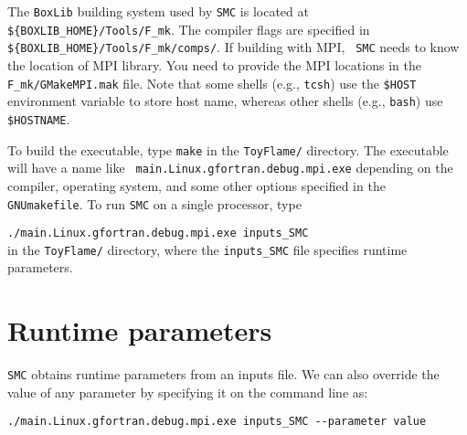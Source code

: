 \documentclass[11pt,letterpaper]{article}
\begin{document}
The {\tt BoxLib} building system used by {\tt SMC} is located at {\tt
  \$\{BOXLIB\_HOME\}/Tools/F\_mk}.  The compiler flags are specified in {\tt
  \$\{BOXLIB\_HOME\}/Tools/F\_mk/comps/}.  If building with MPI, {\tt
  SMC} needs to know the location of MPI library.  You need to provide
the MPI locations in the {\tt F\_mk/GMakeMPI.mak} file.  Note that
some shells (e.g., {\tt tcsh}) use the {\tt \$HOST} environment
variable to store host name, whereas other shells (e.g., {\tt bash})
use {\tt \$HOSTNAME}.

To build the executable, type {\tt make} in the {\tt ToyFlame/}
directory.  The executable will have a name like {\tt
  main.Linux.gfortran.debug.mpi.exe} depending on the compiler,
operating system, and some other options specified in the {\tt
  GNUmakefile}.  To run {\tt SMC} on a single processor, type
\vspace{5pt}

\verb|./main.Linux.gfortran.debug.mpi.exe inputs_SMC|\vspace{5pt}\\
in the {\tt ToyFlame/} directory, where the {\tt inputs\_SMC} file
specifies runtime parameters. 

\section{Runtime parameters}

{\tt SMC} obtains runtime parameters from an inputs file.  We can also
override the value of any parameter by specifying it on the
command line as:\vspace{5pt}

\verb|./main.Linux.gfortran.debug.mpi.exe inputs_SMC --parameter value|\\
\end{document}
